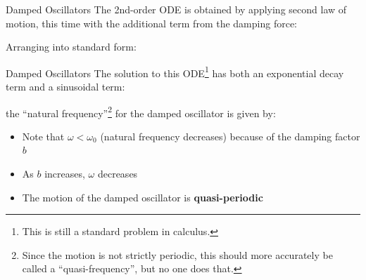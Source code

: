 \documentclass[12pt,compress,aspectratio=169]{beamer}
\begin{document}
\begin{frame}{Damped Oscillators}
  The 2nd-order ODE is obtained by applying second law of motion, this time
  with the additional term from the damping force:


  Arranging into standard form:
  
\end{frame}



\begin{frame}{Damped Oscillators}
  The solution to this ODE\footnote{This is still a standard problem in
    calculus.} has both an {\color{magenta}exponential decay term} and a
  {\color{cyan}sinusoidal term}:


  the ``natural frequency''\footnote{Since the motion is not strictly periodic,
  this should more accurately be called a ``quasi-frequency'', but no one does
  that.} for the damped oscillator is given by:

  \begin{itemize}
  \item\vspace{-.05in}Note that $\omega<\omega_0$ (natural frequency decreases)
    because of the damping factor $b$
  \item As $b$ increases, $\omega$ decreases
  \item The motion of the damped oscillator is \textbf{quasi-periodic}
  \end{itemize}
  \vspace{.1in}
\end{frame}
\end{document}
